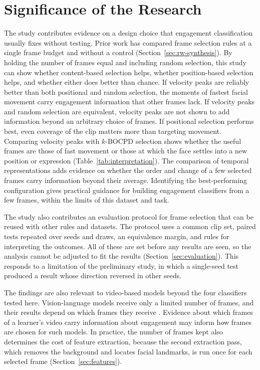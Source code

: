 
\section{Significance of the Research}
\label{sec:significance}

The study contributes evidence on a design choice that engagement classification usually fixes without testing. Prior work has compared frame selection rules at a single frame budget and without a control (Section~\ref{sec:rw-synthesis}). By holding the number of frames equal and including random selection, this study can show whether content-based selection helps, whether position-based selection helps, and whether either does better than chance. If velocity peaks are reliably better than both positional and random selection, the moments of fastest facial movement carry engagement information that other frames lack. If velocity peaks and random selection are equivalent, velocity peaks are not shown to add information beyond an arbitrary choice of frames. If positional selection performs best, even coverage of the clip matters more than targeting movement. Comparing velocity peaks with $k$-BOCPD selection shows whether the useful frames are those of fast movement or those at which the face settles into a new position or expression (Table~\ref{tab:interpretation}). The comparison of temporal representations adds evidence on whether the order and change of a few selected frames carry information beyond their average. Identifying the best-performing configuration gives practical guidance for building engagement classifiers from a few frames, within the limits of this dataset and task.

The study also contributes an evaluation protocol for frame selection that can be reused with other rules and datasets. The protocol uses a common clip set, paired tests repeated over seeds and draws, an equivalence margin, and rules for interpreting the outcomes. All of these are set before any results are seen, so the analysis cannot be adjusted to fit the results (Section~\ref{sec:evaluation}). This responds to a limitation of the preliminary study, in which a single-seed test produced a result whose direction reversed in other seeds.

The findings are also relevant to video-based models beyond the four classifiers tested here. Vision-language models receive only a limited number of frames, and their results depend on which frames they receive \cite{brkic2025,tang2025aks}. Evidence about which frames of a learner's video carry information about engagement may inform how frames are chosen for such models. In practice, the number of frames kept also determines the cost of feature extraction, because the second extraction pass, which removes the background and locates facial landmarks, is run once for each selected frame (Section~\ref{sec:features}).

